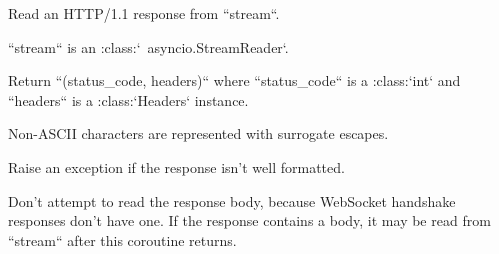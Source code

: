 \begin{DoxyVerb}Read an HTTP/1.1 response from ``stream``.

``stream`` is an :class:`~asyncio.StreamReader`.

Return ``(status_code, headers)`` where ``status_code`` is a :class:`int`
and ``headers`` is a :class:`Headers` instance.

Non-ASCII characters are represented with surrogate escapes.

Raise an exception if the response isn't well formatted.

Don't attempt to read the response body, because WebSocket handshake
responses don't have one. If the response contains a body, it may be
read from ``stream`` after this coroutine returns.\end{DoxyVerb}
 